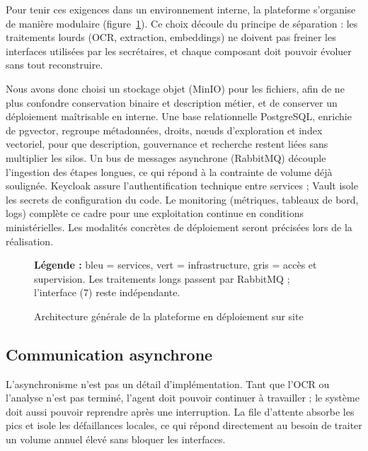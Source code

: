 Pour tenir ces exigences dans un environnement interne, la plateforme s'organise de manière modulaire (figure~\ref{fig:archi-generale-conception}). Ce choix découle du principe de séparation : les traitements lourds (OCR, extraction, embeddings) ne doivent pas freiner les interfaces utilisées par les secrétaires, et chaque composant doit pouvoir évoluer sans tout reconstruire.

Nous avons donc choisi un stockage objet (MinIO) pour les fichiers, afin de ne plus confondre conservation binaire et description métier, et de conserver un déploiement maîtrisable en interne. Une base relationnelle PostgreSQL, enrichie de pgvector, regroupe métadonnées, droits, nœuds d'exploration et index vectoriel, pour que description, gouvernance et recherche restent liées sans multiplier les silos. Un bus de messages asynchrone (RabbitMQ) découple l'ingestion des étapes longues, ce qui répond à la contrainte de volume déjà soulignée. Keycloak assure l'authentification technique entre services ; Vault isole les secrets de configuration du code. Le monitoring (métriques, tableaux de bord, logs) complète ce cadre pour une exploitation continue en conditions ministérielles. Les modalités concrètes de déploiement seront précisées lors de la réalisation.

\begin{figure}[H]
\centering
\resizebox{\textwidth}{!}{}
\vspace{0.35em}
{\footnotesize\textbf{Légende :} bleu = services, vert = infrastructure, gris = accès et supervision.
Les traitements longs passent par RabbitMQ ; l'interface (7) reste indépendante.\par}
\caption{Architecture générale de la plateforme en déploiement sur site}
\label{fig:archi-generale-conception}
\end{figure}

\subsection{Communication asynchrone}

L'asynchronisme n'est pas un détail d'implémentation. Tant que l'OCR ou l'analyse n'est pas terminé, l'agent doit pouvoir continuer à travailler ; le système doit aussi pouvoir reprendre après une interruption. La file d'attente absorbe les pics et isole les défaillances locales, ce qui répond directement au besoin de traiter un volume annuel élevé sans bloquer les interfaces.

